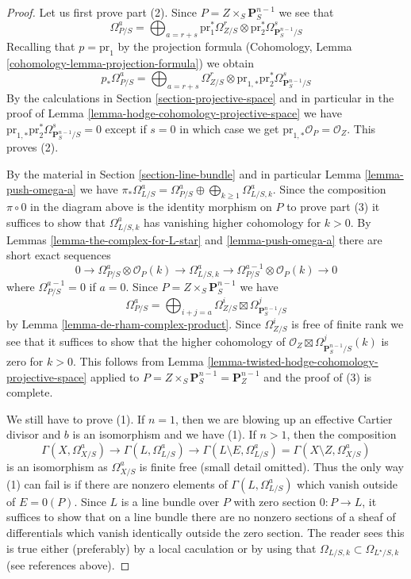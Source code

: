 \begin{proof}
Let us first prove part (2). Since
$P = Z \times_S \mathbf{P}^{n - 1}_S$
we see that
$$
\Omega^a_{P/S} = \bigoplus\nolimits_{a = r + s}
\text{pr}_1^*\Omega^r_{Z/S} \otimes
\text{pr}_2^*\Omega^s_{\mathbf{P}^{n - 1}_S/S}
$$
Recalling that $p = \text{pr}_1$ by the projection formula
(Cohomology, Lemma \ref{cohomology-lemma-projection-formula})
we obtain
$$
p_*\Omega^a_{P/S} = \bigoplus\nolimits_{a = r + s}
\Omega^r_{Z/S} \otimes
\text{pr}_{1, *}\text{pr}_2^*\Omega^s_{\mathbf{P}^{n - 1}_S/S}
$$
By the calculations in Section \ref{section-projective-space}
and in particular in
the proof of Lemma \ref{lemma-hodge-cohomology-projective-space}
we have $\text{pr}_{1, *}\text{pr}_2^*\Omega^s_{\mathbf{P}^{n - 1}_S/S} = 0$
except if $s = 0$ in which case we get
$\text{pr}_{1, *}\mathcal{O}_P = \mathcal{O}_Z$.
This proves (2).

\medskip\noindent
By the material in Section \ref{section-line-bundle} and in particular
Lemma \ref{lemma-push-omega-a} we have
$\pi_*\Omega^a_{L/S} = \Omega^a_{P/S} \oplus
\bigoplus_{k \geq 1} \Omega^a_{L/S, k}$.
Since the composition $\pi \circ 0$ in the diagram above
is the identity morphism on $P$ to prove part (3) it suffices to show that
$\Omega^a_{L/S, k}$ has vanishing higher cohomology for $k > 0$.
By Lemmas \ref{lemma-the-complex-for-L-star} and \ref{lemma-push-omega-a}
there are short exact sequences
$$
0 \to \Omega^a_{P/S} \otimes \mathcal{O}_P(k)
\to \Omega^a_{L/S, k} \to
\Omega^{a - 1}_{P/S} \otimes \mathcal{O}_P(k) \to 0
$$
where $\Omega^{a - 1}_{P/S} = 0$ if $a = 0$. Since
$P = Z \times_S \mathbf{P}^{n - 1}_S$ we have
$$
\Omega^a_{P/S} = \bigoplus\nolimits_{i + j = a}
\Omega^i_{Z/S} \boxtimes \Omega^j_{\mathbf{P}^{n - 1}_S/S}
$$
by Lemma \ref{lemma-de-rham-complex-product}.
Since $\Omega^i_{Z/S}$ is free of finite rank
we see that it suffices to show that the higher cohomology of
$\mathcal{O}_Z \boxtimes \Omega^j_{\mathbf{P}^{n - 1}_S/S}(k)$
is zero for $k > 0$. This follows from
Lemma \ref{lemma-twisted-hodge-cohomology-projective-space}
applied to $P = Z \times_S \mathbf{P}^{n - 1}_S = \mathbf{P}^{n - 1}_Z$
and the proof of (3) is complete.

\medskip\noindent
We still have to prove (1). If $n = 1$, then we are blowing
up an effective Cartier divisor and $b$ is an isomorphism
and we have (1). If $n > 1$, then the composition
$$
\Gamma(X, \Omega^a_{X/S})
\to
\Gamma(L, \Omega^a_{L/S})
\to
\Gamma(L \setminus E, \Omega^a_{L/S})
=
\Gamma(X \setminus Z, \Omega^a_{X/S})
$$
is an isomorphism as $\Omega^a_{X/S}$ is finite free
(small detail omitted). Thus the only way (1) can fail is if
there are nonzero elements of $\Gamma(L, \Omega^a_{L/S})$ which vanish
outside of $E = 0(P)$. Since $L$ is a line bundle over $P$
with zero section $0 : P \to L$, it suffices to show that
on a line bundle there are no nonzero sections of a sheaf
of differentials which vanish identically outside the zero section.
The reader sees this is true either (preferably) by a local caculation
or by using that $\Omega_{L/S, k} \subset \Omega_{L^\star/S, k}$
(see references above).
\end{proof}

